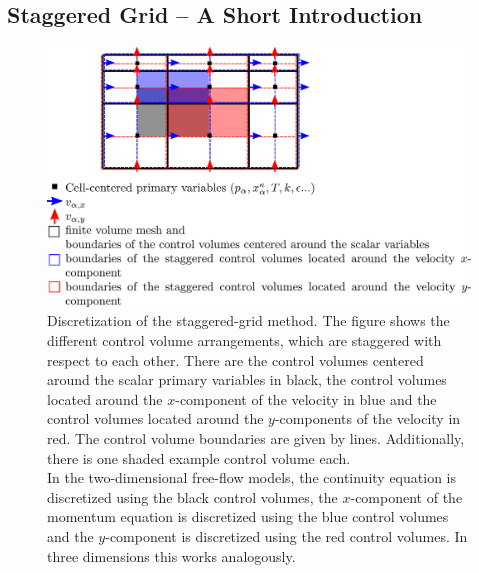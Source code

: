 
\subsection{Staggered Grid -- A Short Introduction}\label{staggered}

\begin{figure}[ht]
\centering
\includegraphics[width=.8\linewidth]{./pdf/staggered_grid.pdf}
\caption{\label{pc:staggered} Discretization of the staggered-grid method. The figure shows the different control volume arrangements, which are staggered with respect to each other. There are the control volumes centered around the scalar primary variables in black, the control volumes located around the $x$-component of the velocity in blue and the control volumes located around the $y$-components of the velocity in red. The control volume boundaries are given by lines. Additionally, there is one shaded example control volume each.\\
In the two-dimensional free-flow models, the continuity equation is discretized using the black control volumes, the $x$-component of the momentum equation is discretized using the blue control volumes and the $y$-component is discretized using the red control volumes. In three dimensions this works analogously.}
\end{figure}

